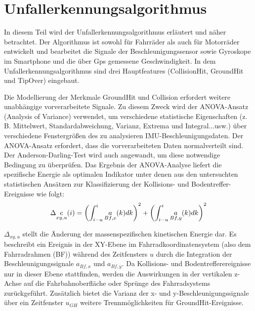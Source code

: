 %
%
%
%
%
%
%
\section{Unfallerkennungsalgorithmus} \label{abs:Unfallerkennungsalgorithmus}
%
%
%
%

In diesem Teil wird der Unfallerkennungsalgorithmus erläutert und näher betrachtet. Der Algorithmus ist sowohl für Fahrräder als auch für Motorräder entwickelt und bearbeitet die Signale der Beschleunigungssensor sowie Gyroskope im Smartphone und die über Gps gemessene Geschwindigkeit. In dem Unfallerkennungsalgorithmus sind drei Hauptfeatures (CollisionHit, GroundHit und TipOver) eingebaut.

Die Modellierung der Merkmale GroundHit und Collision erfordert weitere unabhängige vorverarbeitete Signale. Zu diesem Zweck wird der ANOVA-Ansatz (Analysis of Variance) verwendet, um verschiedene statistische Eigenschaften (z. B. Mittelwert, Standardabweichung, Varianz, Extrema und Integral...usw.) über verschiedene Fenstergrößen des zu analysieren IMU-Beschleunigungsdaten. Der ANOVA-Ansatz erfordert, dass die vorverarbeiteten Daten normalverteilt sind. Der Anderson-Darling-Test wird auch angewandt, um diese notwendige Bedingung zu überprüfen. Das Ergebnis der ANOVA-Analyse liefert die spezifische Energie als optimalen Indikator unter denen aus den untersuchten statistischen Ansätzen zur Klassifizierung der Kollisions- und Bodentreffer-Ereignisse wie folgt:
\begin{equation}
	\centering
	\begin{gathered}
		\Delta\underset{xy,u}{e} (i) = \left(\int_{i-u}^{i} \underset{Bf,x}{a}(k) dk \right)^2 + \left(\int_{i-u}^{i} \underset{Bf,y}{a}(k) dk \right)^2
		\label{gl:EnergieFormel_JanPaper}
	\end{gathered}
\end{equation}


$\Delta_{xy,u}$ stellt die Änderung der massenspezifischen kinetischen Energie dar. Es beschreibt ein Ereignis in der XY-Ebene im Fahrradkoordinatensystem (also dem Fahrradrahmen (BF)) während des Zeitfensters $u$ durch die Integration der Beschleunigungssignale $a_{Bf,x}$ und $a_{Bf,y}$. Da Kollisions- und Bodentrefferereignisse nur in dieser Ebene stattfinden, werden die Auswirkungen in der vertikalen z-Achse auf die Fahrbahnoberfläche oder Sprünge des Fahrradsystems zurückgeführt. Zusätzlich bietet die Varianz der x- und y-Beschleunigungssignale über ein Zeitfenster $u_{GH}$ weitere Trennmöglichkeiten für GroundHit-Ereignisse. \citep{Schneeclassification2021}

